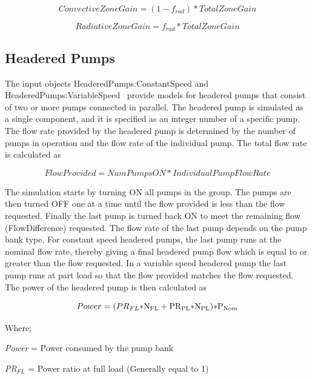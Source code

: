 \begin{equation}
ConvectiveZoneGain = \left( {1 - {f_{rad}}} \right)*TotalZoneGain
\end{equation}

\begin{equation}
RadiativeZoneGain = {f_{rad}}*TotalZoneGain
\end{equation}

\subsection{Headered Pumps}\label{headered-pumps}

The input objects HeaderedPumps:ConstantSpeed and HeaderedPumps:VariableSpeed ~provide models for headered pumps that consist of two or more pumps connected in parallel. The headered pump is simulated as a single component, and it is specified as an integer number of a specific pump. The flow rate provided by the headered pump is determined by the number of pumps in operation and the flow rate of the individual pump. The total flow rate is calculated as

\begin{equation}
FlowProvided = NumPumpsON*IndividualPumpFlowRate
\end{equation}

The simulation starts by turning ON all pumps in the group. The pumps are then turned OFF one at a time until the flow provided is less than the flow requested. Finally the last pump is turned back ON to meet the remaining flow (FlowDifference) requested. The flow rate of the last pump depends on the pump bank type. For constant speed headered pumps, the last pump runs at the nominal flow rate, thereby giving a final headered pump flow which is equal to or greater than the flow requested. In a variable speed headered pump the last pump runs at part load so that the flow provided matches the flow requested. The power of the headered pump is then calculated as

\begin{equation}
Power = (P{R_{FL}}{\rm{*N}}{}_{{\rm{FL}}} + {\rm{P}}{{\rm{R}}_{{\rm{PL}}}}{\rm{*}}{{\rm{N}}_{{\rm{PL}}}}{\rm{)*}}{{\rm{P}}_{{\rm{Nom}}}}{\rm{  }}
\end{equation}

Where;

\emph{Power} = Power consumed by the pump bank

\emph{PR\(_{FL}\)} = Power ratio at full load (Generally equal to 1)

